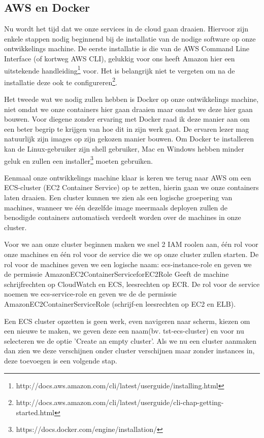 \documentclass{article}
\begin{document}
	\subsection{AWS en Docker}
	Nu wordt het tijd dat we onze services in de cloud gaan draaien. Hiervoor zijn enkele stappen nodig beginnend bij de installatie van de nodige software op onze ontwikkelings machine. De eerste installatie is die van de AWS Command Line Interface (of kortweg AWS CLI), gelukkig voor ons heeft Amazon hier een uitstekende handleiding\footnote{http://docs.aws.amazon.com/cli/latest/userguide/installing.html}
	voor. Het is belangrijk niet te vergeten om na de installatie deze ook te configureren\footnote{http://docs.aws.amazon.com/cli/latest/userguide/cli-chap-getting-started.html}.
	\par
	Het tweede wat we nodig zullen hebben is Docker op onze ontwikkelings machine, niet omdat we onze containers hier gaan draaien maar omdat we deze hier gaan bouwen. Voor diegene zonder ervaring met Docker raad ik deze manier aan om een beter begrip te krijgen van hoe dit in zijn werk gaat. De ervaren lezer mag natuurlijk zijn images op zijn gekozen manier bouwen. Om Docker te installeren kan de Linux-gebruiker zijn shell gebruiker, Mac en Windows hebben minder geluk en zullen een installer\footnote{https://docs.docker.com/engine/installation/} moeten gebruiken.
	\par
	Eenmaal onze ontwikkelings machine klaar is keren we terug naar AWS om een ECS-cluster (EC2 Container Service) op te zetten, hierin gaan we onze containers laten draaien. Een cluster kunnen we zien als een logische groepering van machines, wanneer we één dezelfde image meermaals deployen zullen de benodigde containers automatisch verdeelt worden over de machines in onze cluster.
	\par
	Voor we aan onze cluster beginnen maken we snel 2 IAM roolen aan, één rol voor onze machines en één rol voor de service die we op onze cluster zullen starten. De rol voor de machines geven we een logische naam: ecs-instance-role en geven we de permissie AmazonEC2ContainerServiceforEC2Role {Geeft de machine schrijfrechten op CloudWatch en ECS, leesrechten op ECR}. De rol voor de service noemen we ecs-service-role en geven we de de permissie AmazonEC2ContainerServiceRole (schrijf-en leesrechten op EC2 en ELB). 
	\par	
	 Een ECS cluster opzetten is geen werk, even navigeren naar scherm, kiezen om een nieuwe te maken, we geven deze een naam(bv. tst-ecs-cluster) en voor nu selecteren we de optie 'Create an empty cluster'. Als we nu een cluster aanmaken dan zien we deze verschijnen onder cluster verschijnen maar zonder instances in, deze toevoegen is een volgende stap.
\end{document}
